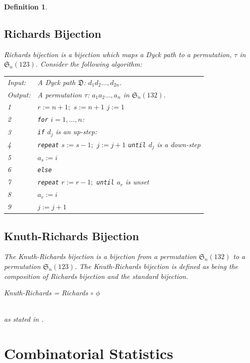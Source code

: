 \documentclass[12pt]{article}
\newtheorem{definition}{Definition}
\newcommand{\sym}{\mathfrak{S}}
\newcommand{\DyckP}{\mathfrak{D}}
\begin{document}
\begin{definition}
\subsection{Richards Bijection}
Richards bijection is a bijection which maps a Dyck path to a permutation, $\tau$ in $\sym_n(123)$.\cite{Clae01}
Consider the following algorithm: \\
\begin{tabular}{ll}
Input:  & A Dyck path $\DyckP$: $d_1d_2\dots,d_{2n}$.\\
Output: & A permutation $\tau$: $a_1a_2\dots,a_n$ in $\sym_n(132)$. \\
1 &\mbox{} $r:=n+1;$ $s:=n+1$ $j:=1$\\
2 &\mbox{} {\tt for} $i=1, \dots, n$: \\
3 &\mbox{} \quad\; {\tt if} $d_j$ is an up-step: \\
4 &\mbox{} \quad\;\quad\; {\tt repeat} $s:=s-1;$ $j:=j+1$ {\tt until} $d_j$ is a down-step \\
5 &\mbox{} \quad\;\quad\; $a_s:=i$ \\
6 &\mbox{} \quad\; {\tt else} \\
7 &\mbox{} \quad\;\quad\; {\tt repeat} $r:=r-1;$ {\tt until} $a_r$ is unset \\
8 &\mbox{} \quad\;\quad\; $a_r:=i$ \\
9 &\mbox{} \quad\; $j:=j+1$
\end{tabular}\bigskip

\subsection{Knuth-Richards Bijection}
\label{sec:KRBijection}
The Knuth-Richards bijection is a bijection from a permutation $\sym_n(132)$ to a permutation $\sym_n(123)$. The Knuth-Richards bijection is defined as being the composition of Richards bijection and the standard bijection.\\
\centerline{Knuth-Richards = Richards $\circ$ $\phi$ }\\
as stated in \cite{Clae01}.

\section{Combinatorial Statistics}

\end{definition}
\end{document}
